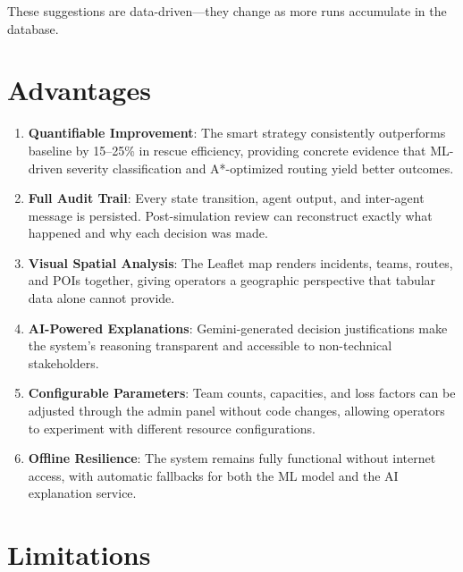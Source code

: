 These suggestions are data-driven---they change as more runs accumulate in the database.

\section{Advantages}
\label{sec:result_advantages}

\begin{enumerate}[leftmargin=*]
    \item \textbf{Quantifiable Improvement}: The smart strategy consistently outperforms baseline by 15--25\% in rescue efficiency, providing concrete evidence that ML-driven severity classification and A*-optimized routing yield better outcomes.

    \item \textbf{Full Audit Trail}: Every state transition, agent output, and inter-agent message is persisted. Post-simulation review can reconstruct exactly what happened and why each decision was made.

    \item \textbf{Visual Spatial Analysis}: The Leaflet map renders incidents, teams, routes, and POIs together, giving operators a geographic perspective that tabular data alone cannot provide.

    \item \textbf{AI-Powered Explanations}: Gemini-generated decision justifications make the system's reasoning transparent and accessible to non-technical stakeholders.

    \item \textbf{Configurable Parameters}: Team counts, capacities, and loss factors can be adjusted through the admin panel without code changes, allowing operators to experiment with different resource configurations.

    \item \textbf{Offline Resilience}: The system remains fully functional without internet access, with automatic fallbacks for both the ML model and the AI explanation service.
\end{enumerate}

\section{Limitations}
\label{sec:result_limitations}

